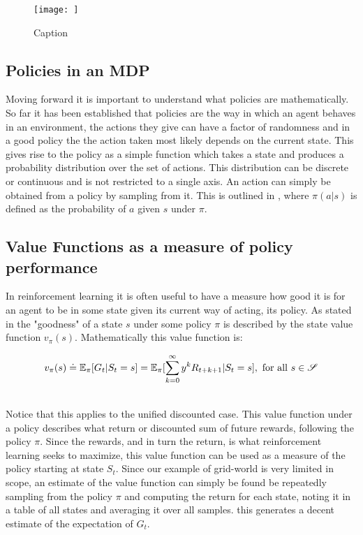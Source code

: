 \begin{figure}[h!]
    \centering
    \texttt{[image: ]}
    \caption{Caption}
    \label{fig:grid_world_return}
\end{figure}

\subsection{Policies in an MDP}
Moving forward it is important to understand what policies are mathematically. So far it has been established that policies are the way in which an agent behaves in an environment, the actions they give can have a factor of randomness and in a good policy the the action taken most likely depends on the current state. This gives rise to the policy as a simple function which takes a state and produces a probability distribution over the set of actions. This distribution can be discrete or continuous and is not restricted to a single axis. An action can simply be obtained from a policy by sampling from it. This is outlined in , where $\pi(a|s)$ is defined as the probability of $a$ given $s$ under $\pi$.

\subsection{Value Functions as a measure of policy  performance}\label{sec:value_functions}
In reinforcement learning it is often useful to have a measure how good it is for an agent to be in some state given its current way of acting, its policy. As stated in  the "goodness" of a state $s$ under some policy $\pi$ is described by the state value function $v_\pi(s)$. Mathematically this value function is:

\begin{equation}\label{state_value_function}
    v_\pi(s) \doteq \mathbb{E}_\pi[G_t | S_t=s] = \mathbb{E}_\pi[\sum_{k=0}^{\infty} y^k R_{t+k+1}|S_t=s] , \mathrm{\ for\ all\ } s \in \mathset{S}
\end{equation}
\centerline{\small{}}

\noindent
\\ Notice that this applies to the unified discounted case. This value function under a policy describes what return or discounted sum of future rewards, following the policy $\pi$. Since the rewards, and in turn the return, is what reinforcement learning seeks to maximize, this value function can be used as a measure of the policy starting at state $S_t$. Since our example of grid-world is very limited in scope, an estimate of the value function can simply be found be repeatedly sampling from the policy $\pi$ and computing the return for each state, noting it in a table of all states and averaging it over all samples. this generates a decent estimate of the expectation of $G_t$.

